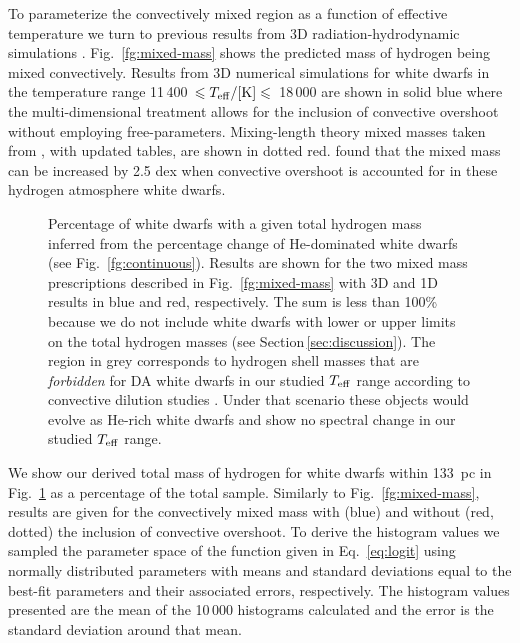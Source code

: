 \documentclass[a4paper,fleqn,usenatbib]{mnras}
\newcommand{\tbetween}[2]{{#1}~$\leqslant T_{\mathrm{eff}}/{\rm [K]} \leqslant $~{#2}}
\begin{document}
To parameterize the convectively mixed region as a function of effective temperature we turn to previous results from 3D radiation-hydrodynamic simulations \citep{cunningham19}. Fig.~\ref{fg:mixed-mass} shows the predicted mass of hydrogen being mixed convectively. Results from 3D numerical simulations for white dwarfs in the temperature range \tbetween{11\,400}{18\,000} are shown in solid blue where the multi-dimensional treatment allows for the inclusion of convective overshoot without employing free-parameters. Mixing-length theory mixed masses taken from \citet{koester09}, with updated tables, are shown in dotted red. \citet{cunningham19} found that the mixed mass can be increased by 2.5 dex when convective overshoot is accounted for in these hydrogen atmosphere white dwarfs.

\begin{figure}
 \centering
 \caption{Percentage of white dwarfs with a given total hydrogen mass inferred from the percentage change of He-dominated white dwarfs (see Fig.~\ref{fg:continuous}). Results are shown for the two mixed mass prescriptions described in Fig.~\ref{fg:mixed-mass} with 3D and 1D results in blue and red, respectively. The sum is less than 100\% because we do not include white dwarfs with lower or upper limits on the total hydrogen masses (see Section\,\ref{sec:discussion}). The region in grey corresponds to hydrogen shell masses that are {\it forbidden} for DA white dwarfs in our studied $T_{\rm eff}$ range according to convective dilution studies \citep{genest-Beaulieu19}. Under that scenario these objects would evolve as He-rich white dwarfs and show no spectral change in our studied $T_{\rm eff}$ range.}
 \label{fg:cum-mass}
\end{figure}

We show our derived total mass of hydrogen for white dwarfs within 133~pc in Fig.~\ref{fg:cum-mass} as a percentage of the total sample. Similarly to Fig.~\ref{fg:mixed-mass}, results are given for the convectively mixed mass with (blue) and without (red, dotted) the inclusion of convective overshoot. To derive the histogram values we sampled the parameter space of the function given in Eq.~\eqref{eq:logit} using normally distributed parameters with means and standard deviations equal to the best-fit parameters and their associated errors, respectively. The histogram values presented are the mean of the 10\,000 histograms calculated and the error is the standard deviation around that mean.
\end{document}
